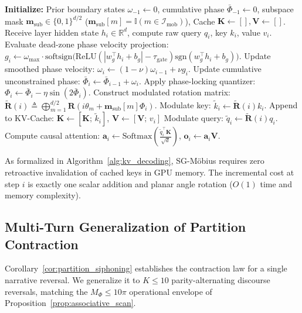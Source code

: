 \documentclass[11pt,a4paper]{article}
\theoremstyle{definition}
\begin{document}
\begin{algorithm}[htbp]
\caption{Autoregressive Generation with Subspace Anti-Phase KV-Cache}
\label{alg:kv_decoding}
\begin{algorithmic}[1]
\STATE \textbf{Initialize:} Prior boundary states $\omega_{-1} \gets 0$, cumulative phase $\bar{\Phi}_{-1} \gets 0$, subspace mask $\mathbf{m}_{\text{sub}} \in \{0, 1\}^{d/2}$ ($\mathbf{m}_{\text{sub}}[m] = \mathbb{I}(m \in \mathcal{I}_{\text{mob}})$), Cache $\mathbf{K} \gets [], \mathbf{V} \gets []$.
    \STATE Receive layer hidden state $h_i \in \mathbb{R}^d$, compute raw query $q_i$, key $k_i$, value $v_i$.
    \STATE Evaluate dead-zone phase velocity projection: $g_i \gets \omega_{\max} \cdot \mathrm{softsign}\big(\mathrm{ReLU}(|w_g^\top h_i + b_g| - \tau_{\text{gate}})\mathrm{sgn}(w_g^\top h_i + b_g)\big)$.
    \STATE Update smoothed phase velocity: $\omega_i \gets (1 - \nu)\omega_{i-1} + \nu g_i$.
    \STATE Update cumulative unconstrained phase: $\bar{\Phi}_i \gets \bar{\Phi}_{i-1} + \omega_i$.
    \STATE Apply phase-locking quantizer: $\Phi_i \gets \bar{\Phi}_i - \eta \sin(2\bar{\Phi}_i)$.
    \STATE Construct modulated rotation matrix: $\tilde{\mathbf{R}}(i) \triangleq \bigoplus_{m=1}^{d/2} \mathbf{R}(i\theta_m + \mathbf{m}_{\text{sub}}[m]\Phi_i)$.
    \STATE Modulate key: $\tilde{k}_i \gets \tilde{\mathbf{R}}(i) k_i$.
    \STATE Append to KV-Cache: $\mathbf{K} \gets [\mathbf{K}; \, \tilde{k}_i]$, $\mathbf{V} \gets [\mathbf{V}; \, v_i]$ 
    \STATE Modulate query: $\tilde{q}_i \gets \tilde{\mathbf{R}}(i) q_i$.
    \STATE Compute causal attention: $\mathbf{a}_i \gets \mathrm{Softmax}\left( \frac{\tilde{q}_i^\top \mathbf{K}}{\sqrt{d}} \right)$, $\mathbf{o}_i \gets \mathbf{a}_i \mathbf{V}$.
\ENDFOR
\end{algorithmic}
\end{algorithm}

As formalized in Algorithm~\ref{alg:kv_decoding}, SG-M\"obius requires zero retroactive invalidation of cached keys in GPU memory. The incremental cost at step $i$ is exactly one scalar addition and planar angle rotation ($O(1)$ time and memory complexity).

\subsection{Multi-Turn Generalization of Partition Contraction}
Corollary~\ref{cor:partition_siphoning} establishes the contraction law for a single narrative reversal. We generalize it to $K \le 10$ parity-alternating discourse reversals, matching the $M_\Phi \le 10\pi$ operational envelope of Proposition~\ref{prop:associative_scan}.
\end{document}
